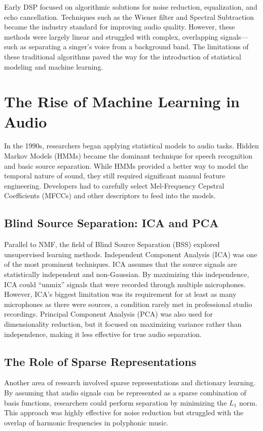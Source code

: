 \documentclass[12pt,a4paper]{article}
\begin{document}
Early DSP focused on algorithmic solutions for noise reduction, equalization, and echo cancellation. Techniques such as the Wiener filter and Spectral Subtraction became the industry standard for improving audio quality. However, these methods were largely linear and struggled with complex, overlapping signals---such as separating a singer's voice from a background band. The limitations of these traditional algorithms paved the way for the introduction of statistical modeling and machine learning.

\section{The Rise of Machine Learning in Audio}
In the 1990s, researchers began applying statistical models to audio tasks. Hidden Markov Models (HMMs) became the dominant technique for speech recognition and basic source separation. While HMMs provided a better way to model the temporal nature of sound, they still required significant manual feature engineering. Developers had to carefully select Mel-Frequency Cepstral Coefficients (MFCCs) and other descriptors to feed into the models.

\subsection{Blind Source Separation: ICA and PCA}
Parallel to NMF, the field of Blind Source Separation (BSS) explored unsupervised learning methods. Independent Component Analysis (ICA) was one of the most prominent techniques. ICA assumes that the source signals are statistically independent and non-Gaussian. By maximizing this independence, ICA could ``unmix'' signals that were recorded through multiple microphones. However, ICA's biggest limitation was its requirement for at least as many microphones as there were sources, a condition rarely met in professional studio recordings. Principal Component Analysis (PCA) was also used for dimensionality reduction, but it focused on maximizing variance rather than independence, making it less effective for true audio separation.

\subsection{The Role of Sparse Representations}
Another area of research involved sparse representations and dictionary learning. By assuming that audio signals can be represented as a sparse combination of basis functions, researchers could perform separation by minimizing the $L_1$ norm. This approach was highly effective for noise reduction but struggled with the overlap of harmonic frequencies in polyphonic music.
\end{document}
